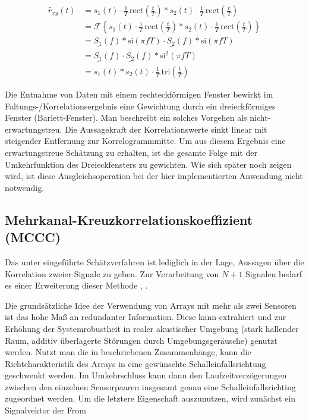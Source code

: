 \begin{align}
        \hat r_{xy}(t) & = s_1(t) \cdot \frac{1}{T} \, \mathrm{rect}\left(\frac{t}{T}\right) \ast s_2(t) \cdot \frac{1}{T} \, \mathrm{rect}\left(\frac{t}{T}\right) \\
                 & = \mathscr{F} \left\{ s_1(t) \cdot \frac{1}{T} \, \mathrm{rect}\left(\frac{t}{T}\right) \ast s_2(t) \cdot \frac{1}{T} \, \mathrm{rect}\left(\frac{t}{T}\right) \right \}\\
                 & = \underline{S_1}(f) \ast \mathrm{si}\left(\pi f T\right) \cdot \underline{S_2}(f) \ast \mathrm{si}\left(\pi f T\right)\\
                 & =  \underline{S_1}(f) \cdot  \underline{S_2}(f) \ast \mathrm{si}^2\left(\pi f T\right) \\
                 & = s_1(t) \ast s_2(t) \cdot \frac{1}{T} \, \mathrm{tri}\left(\frac{t}{T}\right)
\end{align}


Die Entnahme von Daten mit einem rechteckförmigen Fenster bewirkt im Faltungs-/Korrelationsergebnis eine Gewichtung durch ein dreieckförmiges Fenster (Barlett-Fenster). Man beschreibt ein solches Vorgehen als nicht-erwartungstreu. Die Aussagekraft der Korrelationswerte sinkt linear mit steigender Entfernung zur Korrelogrammmitte. Um aus diesem Ergebnis eine erwartungstreue Schätzung zu erhalten, ist die gesamte Folge mit der Umkehrfunktion des Dreieckfensters zu gewichten. Wie sich später noch zeigen wird, ist diese Ausgleichsoperation bei der hier implementierten Anwendung nicht notwendig. 


\subsection{Mehrkanal-Kreuzkorrelationskoeffizient (MCCC)}
\label{subsec:MehrkanalKreuzkorrelationskoeffizient}
Das unter  eingeführte Schätzverfahren ist lediglich in der Lage, Aussagen über die Korrelation zweier Signale zu geben. Zur Verarbeitung von $N+1$ Signalen bedarf es einer Erweiterung dieser Methode \cite[S. 196ff]{Book_Array_Benesty}, \cite{Paper_Array_Benesty}. 

Die grundsätzliche Idee der Verwendung von Arrays mit mehr als zwei Sensoren ist das hohe Maß an redundanter Information. Diese kann extrahiert und zur Erhöhung der Systemrobustheit in realer akustischer Umgebung (\zB stark hallender Raum, additiv überlagerte Störungen durch Umgebungsgeräusche) genutzt werden. Nutzt man die in  beschriebenen Zusammenhänge, kann die Richtcharakteristik des Arrays in eine gewünschte Schalleinfallsrichtung geschwenkt werden. Im Umkehrschluss kann dann den Laufzeitverzögerungen zwischen den einzelnen Sensorpaaren insgesamt genau eine Schalleinfallsrichting zugeordnet werden. Um die letztere Eigenschaft auszunutzen, wird zunächst ein Signalvektor der From

